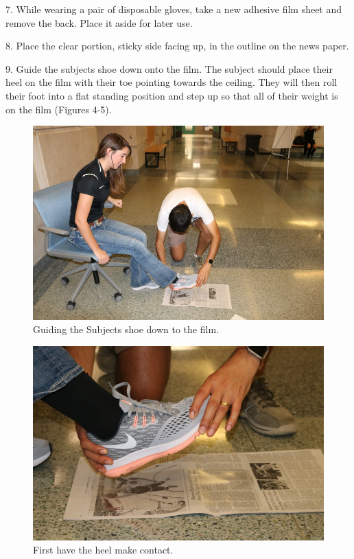 7. While wearing a pair of disposable gloves, take a new adhesive film sheet and remove the back. Place it aside for later use. 

8. Place the clear portion, sticky side facing up, in the outline on the news paper. 

9. Guide the subjects shoe down onto the film. The subject should place their heel on the film with their toe pointing towards the ceiling. They will then roll their foot into a flat standing position and step up so that all of their weight is on the film (Figures 4-5). 

\begin{figure}[!htp]
\centering
\includegraphics[scale=0.3]{Film_Full}
\caption{Guiding the Subjects shoe down to the film.}
\label{Figure 4}
\end{figure}

\begin{figure}[!htp]
\centering
\includegraphics[scale=0.4]{Film_Place}
\caption{First have the heel make contact.}
\label{Figure 5}
\end{figure}

